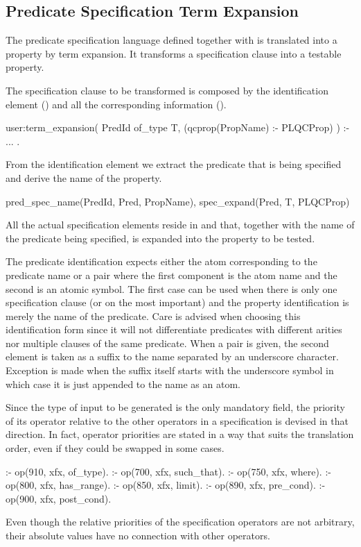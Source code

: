 \subsection{Predicate Specification Term Expansion}

The predicate specification language defined together with \plqc{} is
translated into a \plqc{} property by term expansion.
%
It transforms a specification clause into a testable property.


The specification clause to be transformed is composed by the
identification element () and all the corresponding
information ().
%
\begin{yapcode}
 user:term_expansion(
       PredId of_type T,
       (qcprop(PropName) :- PLQCProp) ) :-
   ...
 .
\end{yapcode}
%
From the identification element we extract the predicate that is being
specified and derive the name of the property.
%
\begin{yapcode}
   pred_spec_name(PredId, Pred, PropName),
   spec_expand(Pred, T, PLQCProp)
\end{yapcode}
%
All the actual specification elements reside in  and that,
together with the name of the predicate being specified, is expanded
into the property to be tested.


The predicate identification expects either the atom corresponding to
the predicate name or a pair where the first component is the atom name
and the second is an atomic symbol.
%
The first case can be used when there is only one specification clause
(or on the most important) and the property identification is merely the
name of the predicate.
%
Care is advised when choosing this identification form since it will not
differentiate predicates with different arities nor multiple clauses of
the same predicate.
%
When a pair is given, the second element is taken as a suffix to the
name separated by an underscore character.
%
Exception is made when the suffix itself starts with the underscore
symbol in which case it is just appended to the name as an atom.


Since the type of input to be generated is the only mandatory field, the
priority of its operator relative to the other operators in a
specification is devised in that direction.
%
In fact, operator priorities are stated in a way that suits the
translation order, even if they could be swapped in some cases.
%
\begin{yapcode}
 :- op(910, xfx, of_type).
 :- op(700, xfx, such_that).
 :- op(750, xfx, where).
 :- op(800, xfx, has_range).
 :- op(850, xfx, limit).
 :- op(890, xfx, pre_cond).
 :- op(900, xfx, post_cond).
\end{yapcode}
%
Even though the relative priorities of the specification operators are
not arbitrary, their absolute values have no connection with other
\Prolog{} operators.


